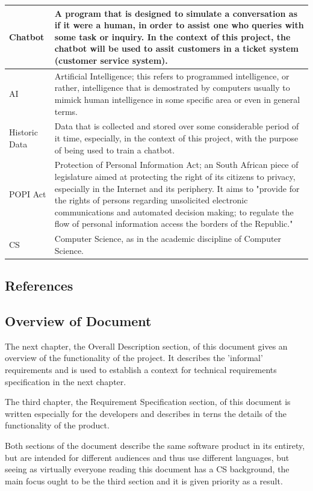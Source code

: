 \documentclass[11pt]{article}
\begin{document}
\begin{tabular}{ |p{2cm}|p{14.7cm}| }
\hline
Chatbot & A program that is designed to simulate a conversation as if it were a human, in order to assist one who queries with some task or inquiry. In the context of this project, the chatbot will be used to assit customers in a ticket system (customer service system). \\
\hline
AI & Artificial Intelligence;  this refers to programmed intelligence, or rather, intelligence that is demostrated by computers usually to mimick human intelligence in some specific area or even in general terms.\\
\hline
Historic Data & Data that is collected and stored over some considerable period of it time, especially, in the context of this project, with the purpose of being used to train a chatbot. \\
\hline
POPI Act & Protection of Personal Information Act; an South African piece of legislature aimed at protecting the right of its citizens to privacy, especially in the Internet and its periphery. It aims to "provide for the rights of persons regarding unsolicited electronic communications and automated decision making; to regulate the flow of personal information access the borders of the Republic."\cite{Legislature:1}\\
\hline
CS & Computer Science, as in the academic discipline of Computer Science.\\
\hline
\end{tabular}

\subsection{References}



\subsection{Overview of Document}
The next chapter, the Overall Description section, of this document gives an overview of the functionality of the project. It describes the 'informal' requirements and is used to establish a context for technical requirements specification in the next chapter.\par
The third chapter, the Requirement Specification section, of this document is written especially for the developers and describes in terns the details of the functionality of the product.\par
Both sections of the document describe the same software product in its entirety, but are intended for different audiences and thus use different languages, but seeing as virtually everyone reading this document has a CS background, the main focus ought to be the third section and it is given priority as a result.
\end{document}
